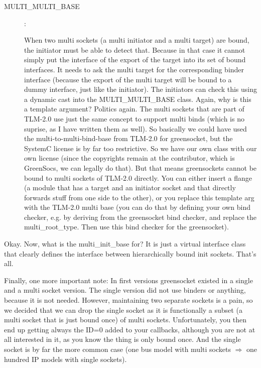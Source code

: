 \documentclass[a4paper,10pt]{article}          %
\newcommand{\code}[1]{{\ttfamily#1}}
\begin{document}
\begin{description}
\item[\code{MULTI\_MULTI\_BASE}]: 

When two multi sockets (a multi initiator and a multi target) are bound, the initiator must be able to detect that. Because in that case it cannot simply put the interface of the export of the target into its set of bound interfaces. It needs to ask the multi target for the corresponding binder interface (because the export of the multi target will be bound to a dummy interface, just like the initiator). The initiators can check this using a dynamic cast into the \code{MULTI\_MULTI\_BASE} class. Again, why is this a template argument? Politics again. The multi sockets that are part of TLM-2.0 use just the same concept to support multi binds (which is no suprise, as I have written them as well). So basically we could have used the multi-to-multi-bind-base from TLM-2.0 for greensocket, but the SystemC license is by far too restrictive. So we have our own class with our own license (since the copyrights remain at the contributor, which is GreenSocs, we can legally do that). But that means greensockets cannot be bound to multi sockets of TLM-2.0 directly. You can either insert a flange (a module that has a target and an initiator socket and that directly forwards stuff from one side to the other), or you replace this template arg with the TLM-2.0 multi base (you can do that by defining your own bind checker, e.g. by deriving from the greensocket bind checker, and replace the \code{multi\_root\_type}. Then use this bind checker for the greensocket).
 
\end{description}

Okay. Now, what is the \code{multi\_init\_base} for? It is just a virtual interface class that clearly defines the interface between hierarchically bound init sockets. That's all.

Finally, one more important note: In first versions greensocket existed in a single and a multi socket version. The single version did not use binders or anything, because it is not needed. However, maintaining two separate sockets is a pain, so we decided that we can drop the single socket as it is functionally a subset (a multi socket that is just bound once) of multi sockets. Unfortunately, you then end up getting always the ID=0 added to your callbacks, although you are not at all interested in it, as you know the thing is only bound once. And the single socket is by far the more common case (one bus model with multi sockets $\Rightarrow$ one hundred IP models with single sockets).
\end{document}
